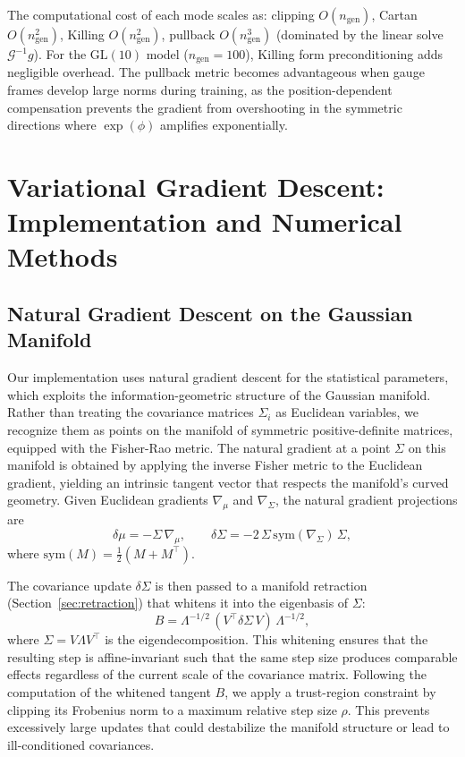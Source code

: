 \documentclass[twoside,11pt]{article}
\begin{document}
The computational cost of each mode scales as: clipping $O(n_{\mathrm{gen}})$, Cartan $O(n_{\mathrm{gen}}^2)$, Killing $O(n_{\mathrm{gen}}^2)$, pullback $O(n_{\mathrm{gen}}^3)$ (dominated by the linear solve $\mathcal{G}^{-1} g$). For the $\mathrm{GL}(10)$ model ($n_{\mathrm{gen}} = 100$), Killing form preconditioning adds negligible overhead. The pullback metric becomes advantageous when gauge frames develop large norms during training, as the position-dependent compensation prevents the gradient from overshooting in the symmetric directions where $\exp(\phi)$ amplifies exponentially.


\section{Variational Gradient Descent: Implementation and Numerical Methods}


\subsection{Natural Gradient Descent on the Gaussian Manifold}
Our implementation uses natural gradient descent for the statistical parameters, which exploits the information-geometric structure of the Gaussian manifold. Rather than treating the covariance matrices $\Sigma_i$ as Euclidean variables, we recognize them as points on the manifold of symmetric positive-definite matrices, equipped with the Fisher-Rao metric. The natural gradient at a point $\Sigma$ on this manifold is obtained by applying the inverse Fisher metric to the Euclidean gradient, yielding an intrinsic tangent vector that respects the manifold's curved geometry. Given Euclidean gradients $\nabla_\mu$ and $\nabla_\Sigma$, the natural gradient projections are
\begin{equation}
\delta\mu = -\Sigma\,\nabla_\mu, \qquad
\delta\Sigma = -2\,\Sigma\,\mathrm{sym}(\nabla_\Sigma)\,\Sigma,
\end{equation}
where $\mathrm{sym}(M) = \tfrac{1}{2}(M + M^\top)$.

The covariance update $\delta\Sigma$ is then passed to a manifold retraction (Section~\ref{sec:retraction}) that whitens it into the eigenbasis of $\Sigma$:
\begin{equation}
B = \Lambda^{-1/2}\, (V^\top \delta\Sigma\, V)\, \Lambda^{-1/2},
\end{equation}
where $\Sigma = V \Lambda V^\top$ is the eigendecomposition.  This whitening ensures that the resulting step is affine-invariant such that the same step size produces comparable effects regardless of the current scale of the covariance matrix.  Following the computation of the whitened tangent $B$, we apply a trust-region constraint by clipping its Frobenius norm to a maximum relative step size $\rho$. This prevents excessively large updates that could destabilize the manifold structure or lead to ill-conditioned covariances.
\end{document}
